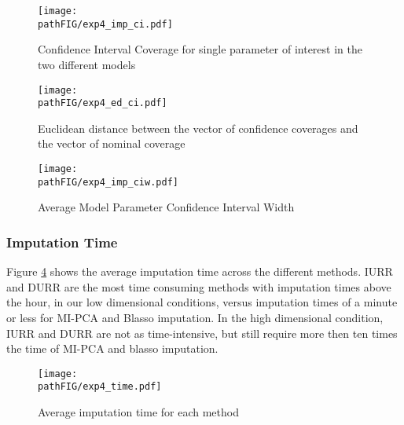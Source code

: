 \begin{figure}
	\texttt{[image: \\pathFIG/exp4\_imp\_ci.pdf]}
	\caption{Confidence Interval Coverage for single parameter of interest in the two 
		different models}
	\label{fig:exp4ci}
\end{figure}

\begin{figure}
	\texttt{[image: \\pathFIG/exp4\_ed\_ci.pdf]}
	\caption{Euclidean distance between the vector of confidence coverages and the vector of 
		nominal coverage}
	\label{fig:exp4cied}
\end{figure}

\begin{figure}
	\texttt{[image: \\pathFIG/exp4\_imp\_ciw.pdf]}
	\caption{Average Model Parameter Confidence Interval Width}
	\label{fig:exp4ciw}
\end{figure}


\subsubsection{Imputation Time}

	Figure \ref{fig:exp4time} shows the average imputation time across the different methods.
	IURR and DURR are the most time consuming methods with imputation times above the hour, 
	in our low dimensional conditions, versus imputation times of a minute or less for MI-PCA and 
	Blasso imputation.
	In the high dimensional condition, IURR and DURR are not as time-intensive, but still 
	require more then ten times the time of MI-PCA and blasso imputation.

\begin{figure}
	\texttt{[image: \\pathFIG/exp4\_time.pdf]}
	\caption{Average imputation time for each method}
	\label{fig:exp4time}
\end{figure}

\FloatBarrier


